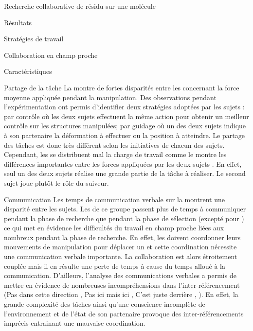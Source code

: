 \documentclass[myfrancais]{mythesis}
\begin{document}
\begin{mychapter}{Recherche collaborative de résidu sur une molécule}
\begin{mysection}{Résultats}
\begin{mysubsection}{Stratégies de travail}
\begin{mysubsubsection}{Collaboration en champ proche}
\begin{myparagraph}{Caractéristiques}
					\end{myparagraph}
					\begin{myparagraph}{Partage de la tâche}
						La  montre de fortes disparités entre les  concernant la force moyenne appliquée pendant la manipulation.
						Des observations pendant l'expérimentation ont permis d'identifier deux stratégies adoptées par les sujets : \og par contrôle \fg où les deux sujets effectuent la même action pour obtenir un meilleur contrôle sur les structures manipulées; \og par guidage \fg où un des deux sujets indique à son partenaire la déformation à effectuer ou la position à atteindre.
						Le partage des tâches est donc très différent selon les initiatives de chacun des sujets.
						Cependant, les  se distribuent mal la charge de travail comme le montre les différences importantes entre les forces appliquées par les deux sujets .
						En effet, seul un des deux sujets réalise une grande partie de la tâche à réaliser.
						Le second sujet joue plutôt le rôle du suiveur.
					\end{myparagraph}
					\begin{myparagraph}{Communication}
						Les temps de communication verbale sur la  montrent une disparité entre les sujets.
						Les  de ce groupe passent plus de temps à communiquer pendant la phase de recherche que pendant la phase de sélection (excepté pour ) ce qui met en évidence les difficultés du travail en champ proche liées aux nombreux  pendant la phase de recherche.
						En effet, les  doivent coordonner leurs mouvements de manipulation pour déplacer un  et cette coordination nécessite une communication verbale importante.
						La collaboration est alors étroitement couplée mais il en résulte une perte de temps à cause du temps alloué à la communication.
						D'ailleurs, l'analyse des communications verbales a permis de mettre en évidence de nombreuses incompréhensions dans l'inter-référencement (\og Pas dans cette direction \fg, \og Pas ici mais ici \fg, \og C'est juste derrière \fg, \myetc).
						En effet, la grande complexité des tâches ainsi qu'une conscience incomplète de l'environnement et de l'état de son partenaire provoque des inter-référencements imprécis entrainant une mauvaise coordination.

\end{myparagraph}
\end{mysubsubsection}
\end{mysubsection}
\end{mysection}
\end{mychapter}
\end{document}
